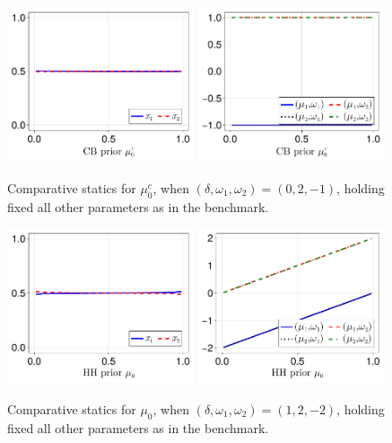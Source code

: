 \documentclass[12pt,a4paper]{article}
\begin{document}
\begin{figure}[H]
\centering
\includegraphics[width=0.49\textwidth]{figures/V8/γ_1/fig_optimal_π_across_μ_0_c_ω_1_2_ω_2_-1_δ_0.0_.pdf}
\includegraphics[width=0.49\textwidth]{figures/V8/γ_1/fig_posterior_across_μ_0_c_ω_1_2_ω_2_-1_δ_0.0_.pdf}
\caption{Comparative statics for $\mu_0^c$, when $(\delta,\omega_1,\omega_2)=(0,2,-1)$, holding fixed all other parameters as in the benchmark.}
\label{FigureA28}
\end{figure}

\begin{figure}[H]
\centering
\includegraphics[width=0.49\textwidth]{figures/V8/γ_1/fig_optimal_π_across_μ_0_ω_1_2_ω_2_-2_δ_1.0_.pdf}
\includegraphics[width=0.49\textwidth]{figures/V8/γ_1/fig_posterior_across_μ_0_ω_1_2_ω_2_-2_δ_1.0_.pdf}
\caption{Comparative statics for $\mu_0$, when $(\delta,\omega_1,\omega_2)=(1,2,-2)$, holding fixed all other parameters as in the benchmark.}
\label{FigureA29}
\end{figure}
\end{document}
